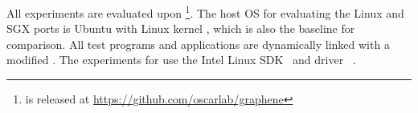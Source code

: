 All experiments are evaluated upon \graphene{} \grapheneversion{}\footnote{\graphene{} is released at \url{https://github.com/oscarlab/graphene}}.
The host OS for evaluating the Linux and SGX ports is Ubuntu \ubuntuversion{} with Linux kernel \linuxversion{},
which is also the baseline for comparison.
All test programs and applications are dynamically linked
with a modified \glibc{} \glibcversion{}.
The experiments for \graphenesgx{}
use the Intel \sgx{} Linux SDK~\cite{intel-sgx-linux-sdk} and driver~\cite{intel-sgx-linux-driver} \sgxdriverversion{}.










